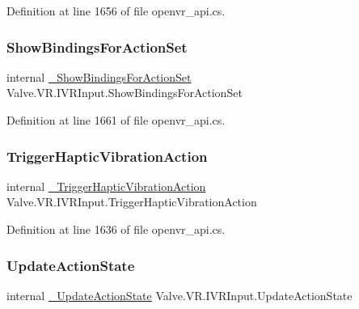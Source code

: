Definition at line 1656 of file openvr\+\_\+api.\+cs.

\mbox{\label{struct_valve_1_1_v_r_1_1_i_v_r_input_a4d11605a94148b00490d688861421bed}} 
\subsubsection{\texorpdfstring{ShowBindingsForActionSet}{ShowBindingsForActionSet}}
{\footnotesize\ttfamily internal \mbox{\hyperlink{struct_valve_1_1_v_r_1_1_i_v_r_input_a88a0bc2f348e8f0bf77bf25907434041}{\+\_\+\+Show\+Bindings\+For\+Action\+Set}} Valve.\+V\+R.\+I\+V\+R\+Input.\+Show\+Bindings\+For\+Action\+Set}



Definition at line 1661 of file openvr\+\_\+api.\+cs.

\mbox{\label{struct_valve_1_1_v_r_1_1_i_v_r_input_ab55041f8c5935e98c8843bc6069c170a}} 
\subsubsection{\texorpdfstring{TriggerHapticVibrationAction}{TriggerHapticVibrationAction}}
{\footnotesize\ttfamily internal \mbox{\hyperlink{struct_valve_1_1_v_r_1_1_i_v_r_input_acccca4f15062478fdac76cc1e1a95ec5}{\+\_\+\+Trigger\+Haptic\+Vibration\+Action}} Valve.\+V\+R.\+I\+V\+R\+Input.\+Trigger\+Haptic\+Vibration\+Action}



Definition at line 1636 of file openvr\+\_\+api.\+cs.

\mbox{\label{struct_valve_1_1_v_r_1_1_i_v_r_input_a73f51af53c4da446957dbfcbab005233}} 
\subsubsection{\texorpdfstring{UpdateActionState}{UpdateActionState}}
{\footnotesize\ttfamily internal \mbox{\hyperlink{struct_valve_1_1_v_r_1_1_i_v_r_input_a71824d045beb4928cad94006a0e435a6}{\+\_\+\+Update\+Action\+State}} Valve.\+V\+R.\+I\+V\+R\+Input.\+Update\+Action\+State}



